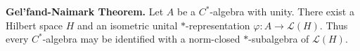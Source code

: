 \textbf{Gel'fand-Naimark Theorem.} Let $A$ be a $C^*$-algebra with unity. There exist a Hilbert space $H$ and an isometric unital $*$-representation $\varphi: A \to \mathcal{L}(H)$. Thus every $C^*$-algebra may be identified with a norm-closed $*$-subalgebra of $\mathcal{L}(H)$.
